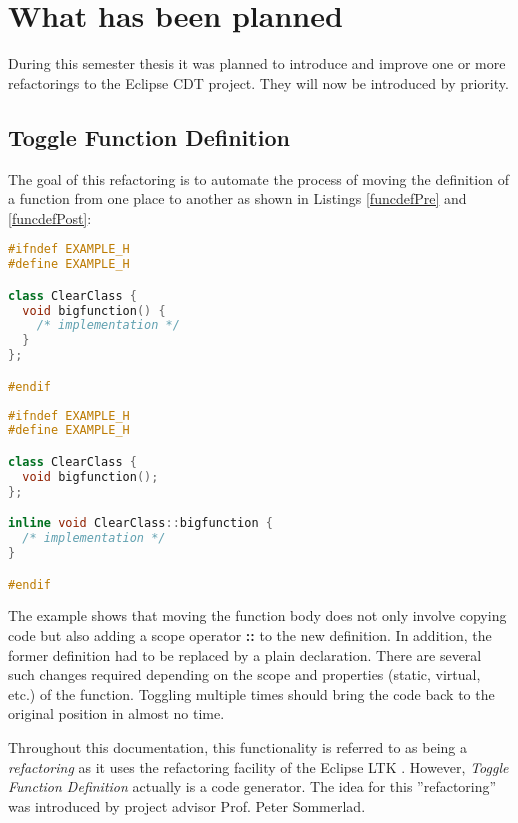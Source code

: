 \section{What has been planned}

During this semester thesis it was planned to introduce and improve one or more
refactorings to the Eclipse CDT project. They will now be introduced by 
priority.

\subsection{Toggle Function Definition}
The goal of this refactoring is to automate the process of moving the definition 
of a function from one place to another as shown in Listings
\ref{funcdefPre} and \ref{funcdefPost}:\newline

\begin{lstlisting}[caption={Initial situation: member function defined inside a
class},label={funcdefPre},language=C++]
#ifndef EXAMPLE_H
#define EXAMPLE_H

class ClearClass {
  void bigfunction() {
    /* implementation */
  }
};

#endif
\end{lstlisting}

\begin{lstlisting}[caption={Separated definition after toggling},
label={funcdefPost},language=C++]
#ifndef EXAMPLE_H
#define EXAMPLE_H

class ClearClass {
  void bigfunction();
};

inline void ClearClass::bigfunction {
  /* implementation */
}

#endif
\end{lstlisting}

The example shows that moving the function body does not only involve copying 
code but also adding a scope operator \textbf{::} to the new definition. In
addition, the 
former definition had to be replaced by a plain declaration. There are several 
such changes required depending on the scope and properties (static, virtual, 
etc.) of the function. Toggling multiple times should bring the code back to the 
original position in almost no time. 

Throughout this documentation, this functionality is referred to as being a 
\textit{refactoring} as it uses the refactoring facility of the Eclipse LTK
\cite{ltk}. However, 
\textit{Toggle Function Definition} actually is a code generator. The idea for 
this ''refactoring'' was introduced by project advisor Prof. Peter Sommerlad.

